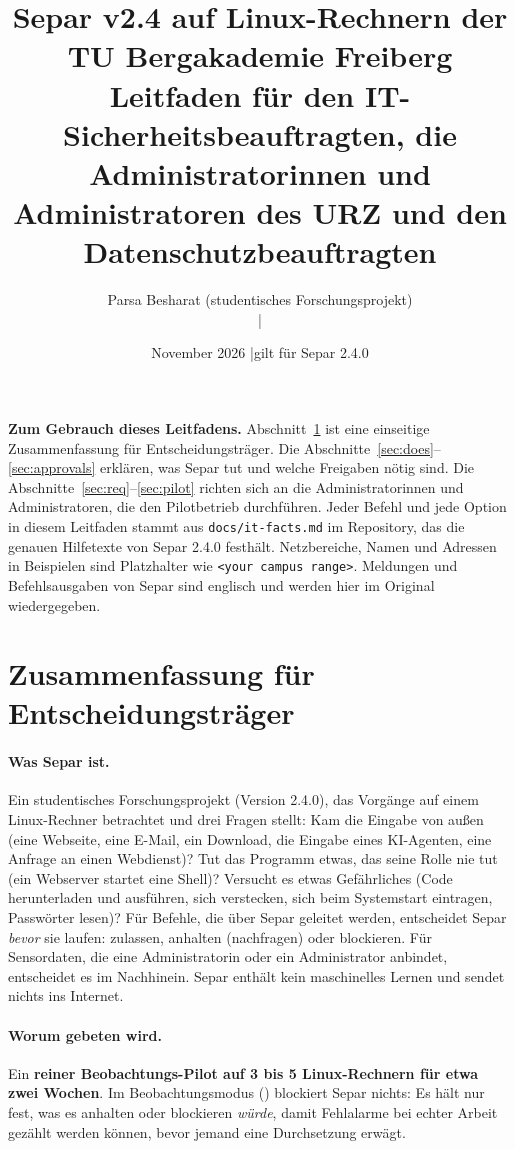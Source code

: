 \documentclass[11pt,a4paper]{article}
\title{\Large\bfseries Separ v2.4 auf Linux-Rechnern der TU Bergakademie Freiberg\\[4pt]
\large Leitfaden für den IT-Sicherheitsbeauftragten, die Administratorinnen und Administratoren des
URZ und den Datenschutzbeauftragten}
\author{Parsa Besharat (studentisches Forschungsprojekt)\\ \contact \quad|\quad \repo}
\date{November 2026 \quad|\quad gilt für Separ 2.4.0}
\begin{document}
\maketitle

\begin{callout}
\textbf{Zum Gebrauch dieses Leitfadens.} Abschnitt~\ref{sec:summary} ist eine einseitige
Zusammenfassung für Entscheidungsträger. Die Abschnitte~\ref{sec:does}--\ref{sec:approvals}
erklären, was Separ tut und welche Freigaben nötig sind. Die
Abschnitte~\ref{sec:req}--\ref{sec:pilot} richten sich an die Administratorinnen und
Administratoren, die den Pilotbetrieb durchführen. Jeder Befehl und jede Option in diesem
Leitfaden stammt aus \texttt{docs/it-facts.md} im Repository, das die genauen Hilfetexte von
Separ 2.4.0 festhält. Netzbereiche, Namen und Adressen in Beispielen sind Platzhalter wie
\texttt{<your campus range>}. Meldungen und Befehlsausgaben von Separ sind englisch und werden
hier im Original wiedergegeben.
\end{callout}

\tableofcontents
\newpage

\section{Zusammenfassung für Entscheidungsträger}
\label{sec:summary}

\paragraph{Was Separ ist.} Ein studentisches Forschungsprojekt (Version 2.4.0), das Vorgänge auf
einem Linux-Rechner betrachtet und drei Fragen stellt: Kam die Eingabe von außen (eine Webseite,
eine E-Mail, ein Download, die Eingabe eines KI-Agenten, eine Anfrage an einen Webdienst)? Tut das
Programm etwas, das seine Rolle nie tut (ein Webserver startet eine Shell)? Versucht es etwas
Gefährliches (Code herunterladen und ausführen, sich verstecken, sich beim Systemstart
eintragen, Passwörter lesen)? Für Befehle, die über Separ geleitet werden, entscheidet Separ
\emph{bevor} sie laufen: zulassen, anhalten (nachfragen) oder blockieren. Für Sensordaten, die
eine Administratorin oder ein Administrator anbindet, entscheidet es im Nachhinein. Separ enthält
kein maschinelles Lernen und sendet nichts ins Internet.

\paragraph{Worum gebeten wird.} Ein \textbf{reiner Beobachtungs-Pilot auf 3 bis 5 Linux-Rechnern
für etwa zwei Wochen}. Im Beobachtungsmodus () blockiert Separ nichts: Es hält nur
fest, was es anhalten oder blockieren \emph{würde}, damit Fehlalarme bei echter Arbeit gezählt
werden können, bevor jemand eine Durchsetzung erwägt.
\end{document}
